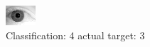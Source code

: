 \begin{figure}[h!]
\begin{center}
\includegraphics[width=0.60\columnwidth]{figures/ID2148_class_4_target_3.png}
\end{center}
\caption{ Classification: 4 actual target: 3}
\label{fig:ID2148_class_4_target_3}
\end{figure}
